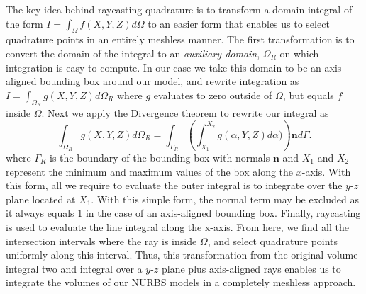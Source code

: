 The key idea behind raycasting quadrature is to transform a domain integral of the form $I=\int_{\Omega} f(X,Y,Z) d\Omega$ to an easier form that enables us to select quadrature points in an entirely meshless manner. The first transformation is to convert the domain of the integral to an \textit{auxiliary domain}, $\Omega_R$ on which integration is easy to compute. In our case we take this domain to be an axis-aligned bounding box around our model, and rewrite integration as $I=\int_{\Omega_R} g(X,Y,Z) d\Omega_R$ where $g$ evaluates to zero outside of $\Omega$, but equals $f$ inside $\Omega$. Next we apply the Divergence theorem  to rewrite our integral as
\newcommand{\Zeta}{\mathrm{Z}}
\begin{equation}
\int_{\Omega_R} g(X,Y,Z) d\Omega_R = \int_{\Gamma_R}\left(\int_{X_1}^{X_2} g(\alpha, Y, Z) d\alpha)\right)\mathbf{n} d\Gamma.
\end{equation}
where $\Gamma_R$ is the boundary of the bounding box with normals $\mathbf{n}$ and $X_1$ and $X_2$ represent the minimum and maximum values of the box along the $x$-axis. With this form, all we require to evaluate the outer integral is to integrate over the $y$-$z$ plane located at $X_1$. With this simple form, the normal term may be excluded as it always equals $1$ in the case of an axis-aligned bounding box. Finally, raycasting is used to evaluate the line integral along the x-axis. From here, we find all the intersection intervals where the ray is inside $\Omega$, and select quadrature points uniformly along this interval. Thus, this transformation from the original volume integral two and integral over a $y$-$z$ plane plus axis-aligned rays enables us to integrate the volumes of our NURBS models in a completely meshless approach.

